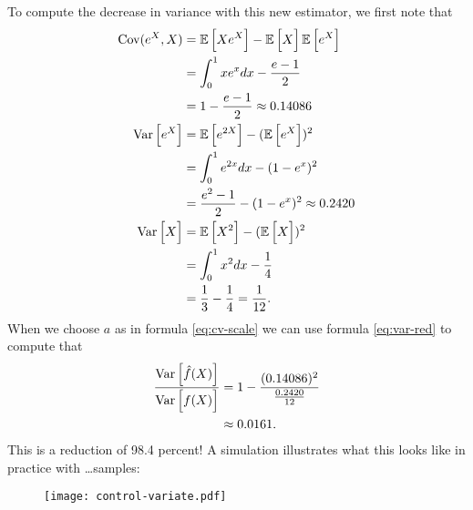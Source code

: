 To compute the decrease in variance with this new estimator, we first note that
\begin{align*}
  \operatorname{Cov}(e^X, X)
    &= \operatorname{\mathbb{E}} \Big[ Xe^X \Big] - \operatorname{\mathbb{E}} \Big[ X \Big]\operatorname{\mathbb{E}} \Big[ e^X \Big] \\
    &= \int_0^1 xe^x dx - \frac{e-1}{2} \\
    &= 1 - \frac{e-1}{2} \approx 0.14086 \\
  \operatorname{Var} \Big[ e^X \Big]
    &= \operatorname{\mathbb{E}} \Big[ e^{2X} \Big] - (\operatorname{\mathbb{E}} \Big[ e^X \Big])^2 \\
    &= \int_0^1 e^{2x} dx - (1 - e^x)^2 \\
    &= \frac{e^2 - 1}{2}  - (1 - e^x)^2 \approx 0.2420 \\
  \operatorname{Var} \Big[ X \Big] &= \operatorname{\mathbb{E}} \Big[ X^2 \Big] - (\operatorname{\mathbb{E}} \Big[ X \Big])^2 \\
    &= \int_0^1 x^2 dx - \frac{1}{4} \\
    &= \frac{1}{3} - \frac{1}{4} = \frac{1}{12}.
\end{align*}
When we choose $a$ as in formula \ref{eq:cv-scale} we can use formula \ref{eq:var-red} to compute that
\begin{align*}
  \frac{ \operatorname{Var} \Big[ \hat{f}(X) \Big] }{ \operatorname{Var} \Big[ f(X) \Big]}
    &= 1 - \frac{(0.14086)^2}{\frac{0.2420}{12}} \\
    &\approx 0.0161.
\end{align*}
This is a reduction of 98.4 percent! A simulation illustrates what this looks like in practice with \dots samples:
\begin{figure}
  \center
  \texttt{[image: control-variate.pdf]}
\end{figure}

